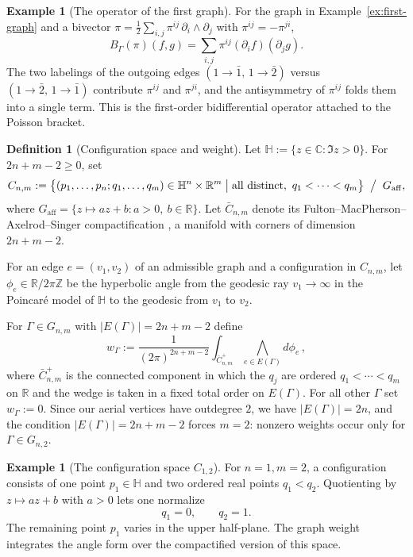 \documentclass[11pt,a4paper]{article}
\theoremstyle{definition}
\newtheorem{definition}[theorem]{Definition}
\newtheorem{example}[theorem]{Example}
\newcommand{\R}{\mathbb{R}}
\newcommand{\C}{\mathbb{C}}
\newcommand{\Z}{\mathbb{Z}}
\newcommand{\HH}{\mathbb{H}}
\begin{document}
\begin{example}[The operator of the first graph]
\label{ex:first-operator}
For the graph in Example~\ref{ex:first-graph} and a bivector
$\pi = \tfrac{1}{2}\sum_{i,j}\pi^{ij}\,\partial_i\wedge\partial_j$
with $\pi^{ij}=-\pi^{ji}$,
\[
B_\Gamma(\pi)(f,g)
=\sum_{i,j}\pi^{ij}(\partial_i f)(\partial_j g).
\]
The two labelings of the outgoing edges $(1\to\bar 1,\,1\to\bar 2)$
versus $(1\to\bar 2,\,1\to\bar 1)$ contribute $\pi^{ij}$ and
$\pi^{ji}$, and the antisymmetry of $\pi^{ij}$ folds them into a
single term. This is the first-order bidifferential operator attached
to the Poisson bracket.
\end{example}

\begin{definition}[Configuration space and weight]\label{def:weight}
Let $\HH := \{z \in \C : \Im z > 0\}$. For $2n + m - 2 \ge 0$, set
\[
C_{n,m} := \bigl\{ (p_{1}, \dots, p_{n}; q_{1}, \dots, q_{m}) \in
\HH^{n} \times \R^{m} \;\big|\; \text{all distinct},\ q_{1} < \cdots < q_{m} \bigr\}
\;\bigm/\; G_{\mathrm{aff}},
\]
where $G_{\mathrm{aff}} = \{ z \mapsto az + b : a > 0,\ b \in \R\}$.
Let $\bar C_{n,m}$ denote its Fulton--MacPherson--Axelrod--Singer
compactification \cite[\S5]{Kontsevich2003}, a manifold with corners of
dimension $2n + m - 2$.

For an edge $e = (v_{1}, v_{2})$ of an admissible graph and a
configuration in $C_{n,m}$, let
$\phi_{e} \in \R / 2\pi\Z$ be the hyperbolic angle from the geodesic
ray $v_{1} \to \infty$ in the Poincar\'e model of $\HH$ to the
geodesic from $v_{1}$ to $v_{2}$.

For $\Gamma \in G_{n,m}$ with $|E(\Gamma)| = 2n + m - 2$ define
\[
w_{\Gamma} :=
\frac{1}{(2\pi)^{2n+m-2}}
\int_{\bar C_{n,m}^{+}} \bigwedge_{e \in E(\Gamma)} d\phi_{e}\,,
\]
where $\bar C_{n,m}^{+}$ is the connected component in which the
$q_{j}$ are ordered $q_{1}<\cdots<q_{m}$ on $\R$ and the wedge is
taken in a fixed total order on $E(\Gamma)$. For all other $\Gamma$
set $w_{\Gamma} := 0$. Since our aerial vertices have outdegree $2$,
we have $|E(\Gamma)| = 2n$, and the condition
$|E(\Gamma)|=2n+m-2$ forces $m = 2$: nonzero weights occur only for
$\Gamma \in G_{n,2}$.
\end{definition}

\begin{example}[The configuration space $C_{1,2}$]
\label{ex:config-12}
For $n=1,m=2$, a configuration consists of one point
$p_1\in\HH$ and two ordered real points $q_1<q_2$. Quotienting by
$z\mapsto az+b$ with $a>0$ lets one normalize
\[
q_1=0,\qquad q_2=1.
\]
The remaining point $p_1$ varies in the upper half-plane. The graph
weight integrates the angle form over the compactified version of this
space.
\end{example}
\end{document}
